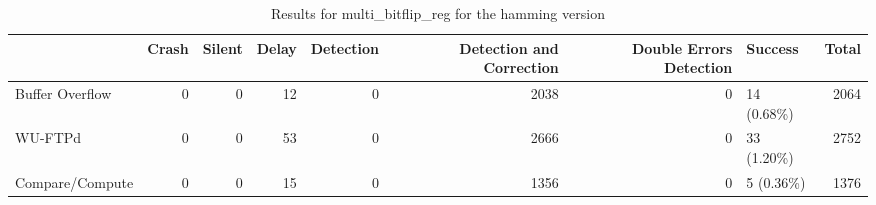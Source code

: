 \begin{table}[t]
	\centering
	\caption{Results for multi_bitflip_reg for the hamming version}
	\label{table:end_sim_by_status_hamming_2_multi_bitflip_reg}
	\begin{tabular}{lrrrrrrlr}
		\toprule
		                & Crash & Silent & Delay & Detection & Detection and Correction & Double Errors Detection & Success     & Total \\
		\midrule
		Buffer Overflow & 0     & 0      & 12    & 0         & 2038                     & 0                       & 14 (0.68\%) & 2064  \\
		WU-FTPd         & 0     & 0      & 53    & 0         & 2666                     & 0                       & 33 (1.20\%) & 2752  \\
		Compare/Compute & 0     & 0      & 15    & 0         & 1356                     & 0                       & 5 (0.36\%)  & 1376  \\
		\bottomrule
	\end{tabular}
\end{table}
